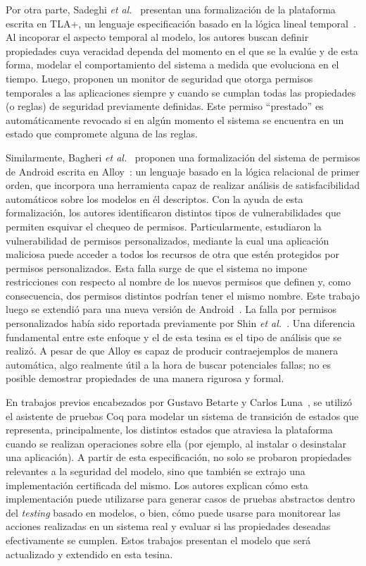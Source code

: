 Por otra parte, Sadeghi \textit{et al.}~\cite{sadeghi-temp} presentan una
formalización de la plataforma escrita en TLA+, un lenguaje especificación
basado en la lógica lineal temporal~\cite{tla+}. Al incoporar el aspecto
temporal al modelo, los autores buscan definir propiedades cuya veracidad
dependa del momento en el que se la evalúe y de esta forma, modelar el
comportamiento del sistema a medida que evoluciona en el tiempo. Luego, proponen
un monitor de seguridad que otorga permisos temporales a las aplicaciones
siempre y cuando se cumplan todas las propiedades (o reglas) de seguridad
previamente definidas. Este permiso ``prestado'' es automáticamente revocado si
en algún momento el sistema se encuentra en un estado que compromete alguna de
las reglas.

Similarmente, Bagheri \textit{et al.}~\cite{bagheri15} proponen una
formalización del sistema de permisos de Android escrita en Alloy~\cite{alloy}:
un lenguaje basado en la lógica relacional de primer orden, que incorpora una
herramienta capaz de realizar análisis de satisfacibilidad automáticos sobre los
modelos en él descriptos. Con la ayuda de esta formalización, los autores
identificaron distintos tipos de vulnerabilidades que permiten esquivar el
chequeo de permisos. Particularmente, estudiaron la vulnerabilidad de permisos
personalizados, mediante la cual una aplicación maliciosa puede acceder a todos
los recursos de otra que estén protegidos por permisos personalizados. Esta
falla surge de que el sistema no impone restricciones con respecto al nombre de
los nuevos permisos que definen y, como consecuencia, dos permisos distintos
podrían tener el mismo nombre. Este trabajo luego se extendió para una nueva
versión de Android~\cite{bagheri}. La falla por permisos personalizados había
sido reportada previamente por Shin \textit{et al.}~\cite{shin-custom}.
%
%
Una diferencia fundamental entre este enfoque y el de esta tesina es el tipo de
análisis que se realizó. A pesar de que Alloy es capaz de producir
contraejemplos de manera automática, algo realmente útil a la hora de buscar
potenciales fallas; no es posible demostrar propiedades de una manera rigurosa y
formal.

En trabajos previos encabezados por Gustavo Betarte y Carlos
Luna~\cite{betarte-2017, betarte-2016, luna-cleiej}, se utilizó el asistente de
pruebas Coq para modelar un sistema de transición de estados que representa,
principalmente, los distintos estados que atraviesa la plataforma cuando se
realizan operaciones sobre ella (por ejemplo, al instalar o desinstalar una
aplicación). A partir de esta especificación, no solo se probaron propiedades
relevantes a la seguridad del modelo, sino que también se extrajo una
implementación certificada del mismo. Los autores explican cómo esta
implementación puede utilizarse para generar casos de pruebas abstractos dentro
del \textit{testing} basado en modelos, o bien, cómo puede usarse para
monitorear las acciones realizadas en un sistema real y evaluar si las
propiedades deseadas efectivamente se cumplen. Estos trabajos presentan el
modelo que será actualizado y extendido en esta tesina.

